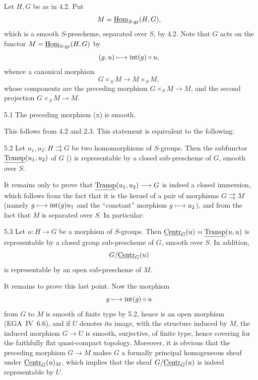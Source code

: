 Let $H,G$ be as in 4.2. Put
\[
M=\underline{\operatorname{Hom}}_{S\text{-gr}}(H,G),
\]
which is a smooth $S$-prescheme, separated over $S$, by 4.2. Note that $G$ acts on the functor $M=\underline{\operatorname{Hom}}_{S\text{-gr}}(H,G)$ by
\[
(g,u)\longmapsto\operatorname{int}(g)\circ u,
\]
whence a canonical morphism
\begin{equation}\tag{x}
G\times_S M\to M\times_S M,
\end{equation}
whose components are the preceding morphism $G\times_S M\to M$, and the second projection $G\times_S M\to M$.
\begin{corollary}{5.1}\label{XI.5.1}
The preceding morphism (x) is smooth.
\end{corollary}
This follows from 4.2 and 2.3. This statement is equivalent to the following:
\begin{corollary}{5.2}\label{XI.5.2}
Let $u_1,u_2:H\rightrightarrows G$ be two homomorphisms of $S$-groups. Then the subfunctor $\underline{\operatorname{Transp}}(u_1,u_2)$ of $G$ () is representable by a closed sub-prescheme of $G$, smooth over $S$.
\end{corollary}
It remains only to prove that $\underline{\operatorname{Transp}}(u_1,u_2)\longrightarrow G$ is indeed a closed immersion, which follows from the fact that it is the kernel of a pair of morphisms $G\rightrightarrows M$ (namely $g\longmapsto\operatorname{int}(g)u_1$ and the ``constant'' morphism $g\longmapsto u_2$), and from the fact that $M$ is separated over $S$. In particular:
\begin{corollary}{5.3}\label{XI.5.3}
Let $u:H\to G$ be a morphism of $S$-groups. Then $\underline{\mathrm{Centr}}_G(u)=\underline{\operatorname{Transp}}(u,u)$ is representable by a closed group sub-prescheme of $G$, smooth over $S$. In addition,
\[G/\underline{\mathrm{Centr}}_G(u)\]
is representable by an open sub-prescheme of $M$.
\end{corollary}
It remains to prove this last point. Now the morphism
\[
g\longmapsto\operatorname{int}(g)\circ u
\]
from $G$ to $M$ is smooth of finite type by 5.2, hence is an open morphism (EGA~IV~6.6), and if $U$ denotes its image, with the structure induced by $M$, the induced morphism $G\to U$ is smooth, surjective, of finite type, hence covering for the faithfully flat quasi-compact topology. Moreover, it is obvious that the preceding morphism $G\to M$ makes $G$ a formally principal homogeneous sheaf under $\underline{\mathrm{Centr}}_G(u)_M$, which implies that the sheaf $G/\underline{\mathrm{Centr}}_G(u)$ is indeed representable by $U$.

